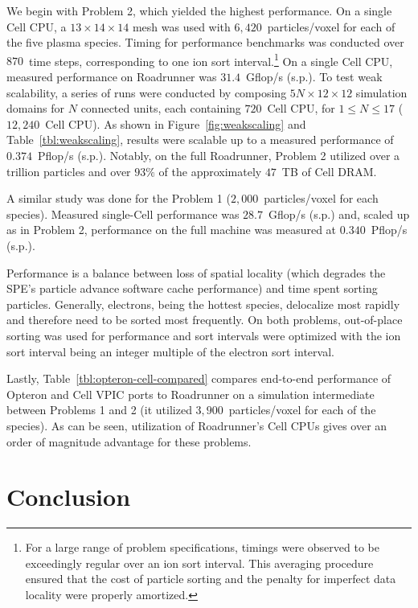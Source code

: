 \documentclass[journal,twoside]{IEEEtran}
\newcommand{\tbl}[1]{Table~\ref{tbl:#1}}
\newcommand{\fig}[1]{Figure~\ref{fig:#1}}
\begin{document}
We begin with Problem 2, which yielded the highest performance.  On a
single Cell CPU, a $13 \times 14 \times 14$ mesh was used with
$6,420$~particles/voxel for each of the five plasma species.  Timing
for performance benchmarks was conducted over $870$~time steps,
corresponding to one ion sort interval.\footnote{For a large range of
problem specifications, timings were observed to be exceedingly
regular over an ion sort interval.  This averaging procedure ensured
that the cost of particle sorting and the penalty for imperfect data
locality were properly amortized.}  On a single Cell CPU, measured
performance on Roadrunner was $31.4$~Gflop/s (s.p.).  To test weak
scalability, a series of runs were conducted by composing $5N \times
12 \times 12$ simulation domains for $N$ connected units, each
containing $720$~Cell CPU, for $1 \le N \le 17$ ($12,240$~Cell CPU).
As shown in \fig{weakscaling} and \tbl{weakscaling}, results were
scalable up to a measured performance of $0.374$~Pflop/s (s.p.).
Notably, on the full Roadrunner, Problem 2 utilized over a trillion
particles and over $93\%$ of the approximately $47$~TB of Cell DRAM.

A similar study was done for the Problem 1 ($2,000$~particles/voxel
for each species).  Measured single-Cell performance was
$28.7$~Gflop/s (s.p.) and, scaled up as in Problem 2, performance on
the full machine was measured at $0.340$~Pflop/s (s.p.).

Performance is a balance between loss of spatial locality (which
degrades the SPE's particle advance software cache performance) and
time spent sorting particles.  Generally, electrons, being the hottest
species, delocalize most rapidly and therefore need to be sorted most
frequently.  On both problems, out-of-place sorting was used for
performance and sort intervals were optimized with the ion sort
interval being an integer multiple of the electron sort interval.

Lastly, \tbl{opteron-cell-compared} compares end-to-end performance of
Opteron and Cell VPIC ports to Roadrunner on a simulation intermediate
between Problems 1 and 2 (it utilized $3,900$~particles/voxel for each
of the species).  As can be seen, utilization of Roadrunner's Cell
CPUs gives over an order of magnitude advantage for these problems.

\section{Conclusion}
\end{document}
